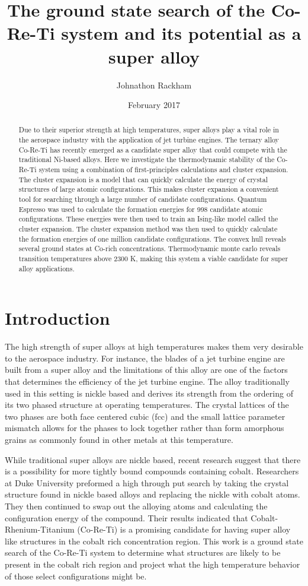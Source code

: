 \documentclass{article}
\title{The ground state search of the Co-Re-Ti system and its potential as a super alloy}
\author{Johnathon Rackham}
\date{February 2017}
\begin{document}
\maketitle

\begin{abstract}
Due to their superior strength at high temperatures, super alloys play a vital role in the aerospace industry with the application of jet turbine engines. The ternary alloy Co-Re-Ti has recently emerged as a candidate super alloy that could compete with the traditional Ni-based alloys. Here we investigate the thermodynamic stability of the Co-Re-Ti system using a combination of first-principles calculations and cluster expansion. The cluster expansion is a model that can quickly calculate the energy of crystal structures of large atomic configurations. This makes cluster expansion a convenient tool for searching through a large number of candidate configurations. Quantum Espresso was used to calculate the formation energies for 998 candidate atomic configurations. These energies were then used to train an Ising-like model called the cluster expansion. The cluster expansion method was then used to quickly calculate the formation energies of one million candidate configurations. The convex hull reveals several ground states at Co-rich concentrations. Thermodynamic monte carlo reveals transition temperatures above 2300 K, making this system a viable candidate for super alloy applications. 
\end{abstract}

\section{Introduction}
The high strength of super alloys at high temperatures makes them very desirable to the aerospace industry. For instance, the blades of a jet turbine engine are built from a super alloy and the limitations of this alloy are one of the factors that determines the efficiency of the jet turbine engine. The alloy traditionally used in this setting is nickle based and derives its strength from the ordering of its two phased structure at operating temperatures. The crystal lattices of the two phases are both face centered cubic (fcc) and the small lattice parameter mismatch allows for the phases to lock together rather than form amorphous grains as commonly found in other metals at this temperature.
	
While traditional super alloys are nickle based, recent research suggest that there is a possibility for more tightly bound compounds containing cobalt. Researchers at Duke University preformed a high through put search by taking the crystal structure found in nickle based alloys and replacing the nickle with cobalt atoms. They then continued to swap out the alloying atoms and calculating the configuration energy of the compound. Their results indicated that Cobalt-Rhenium-Titanium (Co-Re-Ti) is a promising candidate for having super alloy like structures in the cobalt rich concentration region. This work is a ground state search of the Co-Re-Ti system to determine what structures are likely to be present in the cobalt rich region and project what the high temperature behavior of those select configurations might be.
\end{document}
